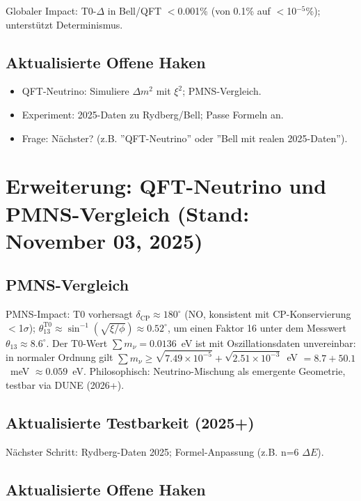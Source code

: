 	Globaler Impact: T0-$\Delta$ in Bell/QFT $<$0.001\% (von 0.1\% auf $<$10$^{-5}$\%); unterstützt Determinismus.
	
	\subsection{Aktualisierte Offene Haken}
	
	\begin{itemize}
		\item QFT-Neutrino: Simuliere $\Delta m^2$ mit $\xi^2$; PMNS-Vergleich.
		\item Experiment: 2025-Daten zu Rydberg/Bell; Passe Formeln an.
		\item Frage: Nächster? (z.B. ''QFT-Neutrino'' oder ''Bell mit realen 2025-Daten'').
	\end{itemize}
	
	\section{Erweiterung: QFT-Neutrino und PMNS-Vergleich (Stand: November 03, 2025)}
	
	\subsection{PMNS-Vergleich}
	
	
	PMNS-Impact: T0 vorhersagt $\delta_\text{CP} \approx 180^\circ$ (NO, konsistent mit CP-Konservierung $<$1$\sigma$); $\theta_{13}^{\text{T0}} \approx \sin^{-1}(\sqrt{\xi / \phi}) \approx 0.52^\circ$, um einen Faktor 16 unter dem Messwert $\theta_{13} \approx 8.6^\circ$. Der T0-Wert $\sum m_\nu = 0.0136$~eV ist mit Oszillationsdaten unvereinbar: in normaler Ordnung gilt $\sum m_\nu \geq \sqrt{7.49\times10^{-5}} + \sqrt{2.51\times10^{-3}}$~eV $= 8.7 + 50.1$~meV $\approx 0.059$~eV. Philosophisch: Neutrino-Mischung als emergente Geometrie, testbar via DUNE (2026+).
	
	\subsection{Aktualisierte Testbarkeit (2025+)}
	
	Nächster Schritt: Rydberg-Daten 2025; Formel-Anpassung (z.B. n=6 $\Delta E$).
	
	\subsection{Aktualisierte Offene Haken}
	

